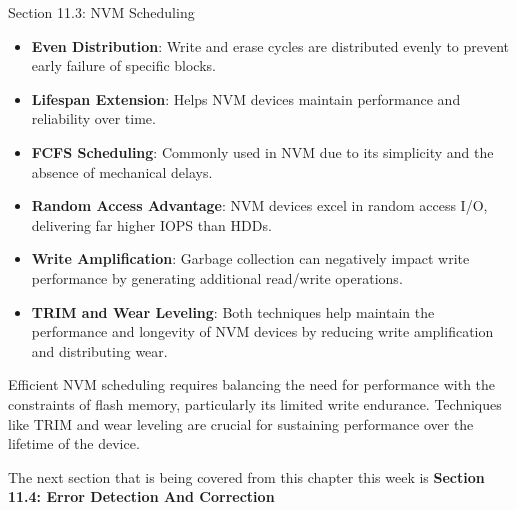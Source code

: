 \begin{notes}{Section 11.3: NVM Scheduling}
    \begin{highlight}
    
        \begin{itemize}
            \item \textbf{Even Distribution}: Write and erase cycles are distributed evenly to prevent early failure of specific blocks.
            \item \textbf{Lifespan Extension}: Helps NVM devices maintain performance and reliability over time.
        \end{itemize}
    
    \end{highlight}
    
    \begin{highlight}
    
        \begin{itemize}
            \item \textbf{FCFS Scheduling}: Commonly used in NVM due to its simplicity and the absence of mechanical delays.
            \item \textbf{Random Access Advantage}: NVM devices excel in random access I/O, delivering far higher IOPS than HDDs.
            \item \textbf{Write Amplification}: Garbage collection can negatively impact write performance by generating additional read/write operations.
            \item \textbf{TRIM and Wear Leveling}: Both techniques help maintain the performance and longevity of NVM devices by reducing write amplification and distributing wear.
        \end{itemize}
    
    Efficient NVM scheduling requires balancing the need for performance with the constraints of flash memory, particularly its limited write endurance. Techniques like TRIM and wear leveling are crucial 
    for sustaining performance over the lifetime of the device.
    
    \end{highlight}

\end{notes}

The next section that is being covered from this chapter this week is \textbf{Section 11.4: Error Detection And Correction}

